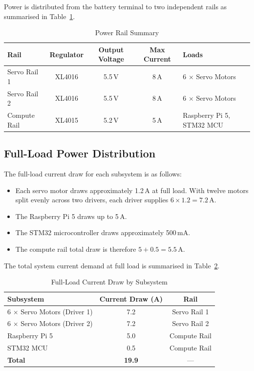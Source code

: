 Power is distributed from the battery terminal to two independent rails as summarised in 
Table~\ref{tab:power_rails}.

\begin{table}[h]
    \centering
    \caption{Power Rail Summary}
    \label{tab:power_rails}
    \begin{tabular}{|l|c|c|c|l|}
        \hline
        \textbf{Rail} & \textbf{Regulator} & \textbf{Output Voltage} & \textbf{Max Current} & \textbf{Loads} \\
        \hline
        Servo Rail 1  & XL4016 & 5.5\,V & 8\,A & 6 $\times$ Servo Motors \\
        Servo Rail 2  & XL4016 & 5.5\,V & 8\,A & 6 $\times$ Servo Motors \\
        Compute Rail  & XL4015 & 5.2\,V & 5\,A & Raspberry Pi 5, STM32 MCU \\
        \hline
    \end{tabular}
\end{table}

\subsection{Full-Load Power Distribution}

The full-load current draw for each subsystem is as follows:

\begin{itemize}
    \item Each servo motor draws approximately 1.2\,A at full load. With twelve motors split 
          evenly across two drivers, each driver supplies $6 \times 1.2 = 7.2$\,A.
    \item The Raspberry Pi 5 draws up to 5\,A.
    \item The STM32 microcontroller draws approximately 500\,mA.
    \item The compute rail total draw is therefore $5 + 0.5 = 5.5$\,A.
\end{itemize}

The total system current demand at full load is summarised in Table~\ref{tab:current_draw}.

\begin{table}[h]
    \centering
    \caption{Full-Load Current Draw by Subsystem}
    \label{tab:current_draw}
    \begin{tabular}{|l|c|c|}
        \hline
        \textbf{Subsystem} & \textbf{Current Draw (A)} & \textbf{Rail} \\
        \hline
        6 $\times$ Servo Motors (Driver 1) & 7.2  & Servo Rail 1 \\
        6 $\times$ Servo Motors (Driver 2) & 7.2  & Servo Rail 2 \\
        Raspberry Pi 5                     & 5.0  & Compute Rail \\
        STM32 MCU                          & 0.5  & Compute Rail \\
        \hline
        \textbf{Total}                     & \textbf{19.9} & --- \\
        \hline
    \end{tabular}
\end{table}

